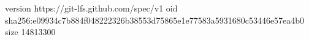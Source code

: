 version https://git-lfs.github.com/spec/v1
oid sha256:e09934c7b884f048222326b38553d75865e1e77583a5931680c53446e57ea4b0
size 14813300
